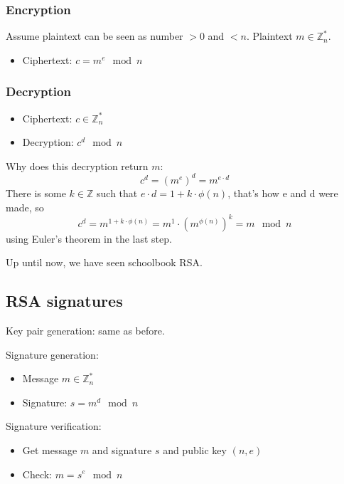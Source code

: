 \documentclass[language=english,number=]{homework}
\begin{document}
    \subsubsection{Encryption}

    Assume plaintext can be seen as number $> 0$ and $< n$.
    Plaintext $m \in \mathbb{Z}_n^*$.
    \begin{itemize}
        \item Ciphertext: $c = m^{e} \mod n$
    \end{itemize}

    \subsubsection{Decryption}

    \begin{itemize}
        \item Ciphertext: $c \in \mathbb{Z}_n^*$
        \item Decryption: $c^d \mod n$
    \end{itemize}

    Why does this decryption return $m$:
    \[
        c^d = (m^e)^d = m^{e \cdot d}
    \]
    There is some $k \in \mathbb{Z}$ such that $e \cdot d = 1 + k \cdot \phi(n)$, that's how e and d were made, so
    \[
        c^d = m^{1 + k \cdot \phi(n)} = m^1 \cdot (m^{\phi(n)})^{k} = m \mod n
    \]
    using Euler's theorem in the last step.

    Up until now, we have seen schoolbook RSA.

    \subsection{RSA signatures}

    Key pair generation: same as before.

    Signature generation:
    \begin{itemize}
        \item Message $m \in \mathbb{Z}_n^*$
        \item Signature: $s = m^{d} \mod n$
    \end{itemize}

    Signature verification:
    \begin{itemize}
        \item Get message $m$ and signature $s$ and public key $(n,e)$
        \item Check: $m = s^e \mod n$
    \end{itemize}
\end{document}
